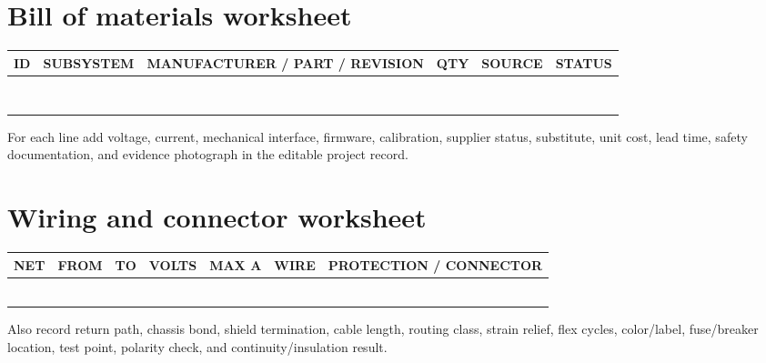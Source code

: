 \documentclass[10pt,openany]{book}
\begin{document}
\chapter{Bill of materials worksheet}

\begin{tabularx}{\textwidth}{p{0.35in} p{1.15in} X p{0.55in} p{0.75in} p{0.8in}}
\toprule
ID & SUBSYSTEM & MANUFACTURER / PART / REVISION & QTY & SOURCE & STATUS\\
\midrule
\rule{0pt}{0.34in} & & & & &\\
\rule{0pt}{0.34in} & & & & &\\
\rule{0pt}{0.34in} & & & & &\\
\rule{0pt}{0.34in} & & & & &\\
\rule{0pt}{0.34in} & & & & &\\
\rule{0pt}{0.34in} & & & & &\\
\rule{0pt}{0.34in} & & & & &\\
\rule{0pt}{0.34in} & & & & &\\
\bottomrule
\end{tabularx}

For each line add voltage, current, mechanical interface, firmware, calibration, supplier status, substitute, unit cost, lead time, safety documentation, and evidence photograph in the editable project record.

\chapter{Wiring and connector worksheet}

\begin{tabularx}{\textwidth}{p{0.55in} p{1in} p{1in} p{0.65in} p{0.58in} p{0.7in} X}
\toprule
NET & FROM & TO & VOLTS & MAX A & WIRE & PROTECTION / CONNECTOR\\
\midrule
\rule{0pt}{0.34in} & & & & & &\\
\rule{0pt}{0.34in} & & & & & &\\
\rule{0pt}{0.34in} & & & & & &\\
\rule{0pt}{0.34in} & & & & & &\\
\rule{0pt}{0.34in} & & & & & &\\
\rule{0pt}{0.34in} & & & & & &\\
\bottomrule
\end{tabularx}

Also record return path, chassis bond, shield termination, cable length, routing class, strain relief, flex cycles, color/label, fuse/breaker location, test point, polarity check, and continuity/insulation result.
\end{document}
